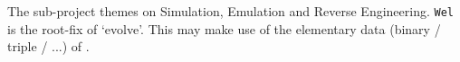 
The sub-project themes on Simulation, Emulation and Reverse Engineering. \verb`Wel` is the root-fix of `evolve'.
This may make use of the elementary data (binary / triple / ...) of .
